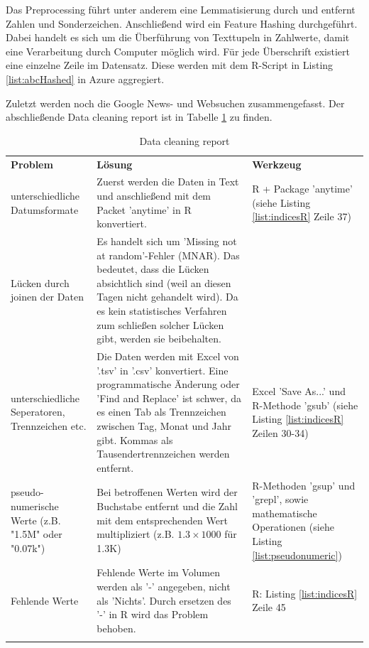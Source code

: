 
Das Preprocessing führt unter anderem eine Lemmatisierung durch und entfernt Zahlen und Sonderzeichen. Anschließend wird ein Feature Hashing durchgeführt. Dabei handelt es sich um die Überführung von Texttupeln in Zahlwerte, damit eine Verarbeitung durch Computer möglich wird. Für jede Überschrift existiert eine einzelne Zeile im Datensatz. Diese werden mit dem R-Script in Listing \ref{list:abcHashed} in Azure aggregiert.

Zuletzt werden noch die Google News- und Websuchen zusammengefasst. Der abschließende Data cleaning report ist in Tabelle \ref{tab:selecData} zu finden.
\begin{longtable}[H]{|p{4cm}|p{8cm}|p{4cm}|}
\hline
\textbf{Problem} & \textbf{Lösung} & \textbf{Werkzeug} \\
\hhline{===} 
unterschiedliche Datumsformate & Zuerst werden die Daten in Text und anschließend mit dem Packet 'anytime' in R konvertiert. & R + Package 'anytime' (siehe Listing \ref{list:indicesR} Zeile 37) \\ \hline
Lücken durch joinen der Daten & Es handelt sich um 'Missing not at random'-Fehler (MNAR)\citep[S.~553]{graham_missing_2009}. Das bedeutet, dass die Lücken absichtlich sind (weil an diesen Tagen nicht gehandelt wird). Da es kein statistisches Verfahren zum schließen solcher Lücken gibt, werden sie beibehalten. \citep[S.~1109]{leonhart_dorsch_2014} & \\ \hline
unterschiedliche Seperatoren, Trennzeichen etc. & Die Daten werden mit Excel von '.tsv' in '.csv' konvertiert. Eine programmatische Änderung oder 'Find and Replace' ist schwer, da es einen Tab als Trennzeichen zwischen Tag, Monat und Jahr gibt. Kommas als Tausendertrennzeichen werden entfernt. & Excel 'Save As...' und R-Methode 'gsub' (siehe Listing \ref{list:indicesR} Zeilen 30-34) \\ \hline
pseudo-numerische Werte (z.B. "1.5M" oder "0.07k") & Bei betroffenen Werten wird der Buchstabe entfernt und die Zahl mit dem entsprechenden Wert multipliziert (z.B. $ 1.3 \times 1000 $ für 1.3K) & R-Methoden 'gsup' und 'grepl', sowie mathematische Operationen (siehe Listing \ref{list:pseudonumeric})\\ \hline
Fehlende Werte & Fehlende Werte im Volumen werden als '-' angegeben, nicht als 'Nichts'. Durch ersetzen des '-' in R wird das Problem behoben. & R: Listing \ref{list:indicesR} Zeile 45 \\ \hline
\caption{Data cleaning report}
\label{tab:selecData}
\end{longtable}
